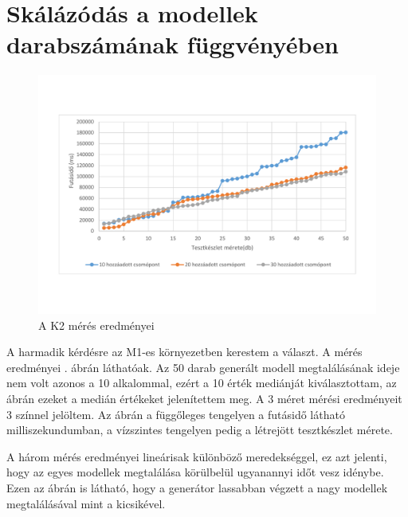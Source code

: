 \section{Skálázódás a modellek darabszámának függvényében}
 
\begin{figure}
	\centering                                                    
	\includegraphics[width=1\textwidth]{figures/statisticsPlottalA}
	\caption{A K2 mérés eredményei}
	\label{fig:AmeresEredmeny}
\end{figure}
                                                                                                                                                                                                                                                                                           
A harmadik kérdésre az M1-es környezetben kerestem a választ. A mérés eredményei . ábrán láthatóak. Az 50 darab generált modell megtalálásának ideje nem volt azonos a 10 alkalommal, ezért a 10 érték mediánját kiválasztottam, az ábrán ezeket a medián értékeket jelenítettem meg. A 3 méret mérési eredményeit 3 színnel jelöltem. Az ábrán a függőleges tengelyen a futásidő látható milliszekundumban,  a vízszintes tengelyen pedig a létrejött tesztkészlet mérete.  

A három mérés eredményei lineárisak különböző meredekséggel, ez azt jelenti, hogy az egyes modellek megtalálása körülbelül ugyanannyi időt vesz idénybe. Ezen az ábrán is látható, hogy a generátor lassabban végzett a nagy modellek megtalálásával  mint a kicsikével. 
                                                                                                               
